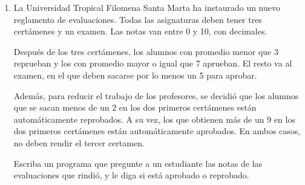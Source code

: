 \documentclass[11pt,spanish]{article}
\newcommand{\pond}[1]{[{\small\textbf{#1\%}}]}
\begin{document}
\begin{enumerate}[font=\Large\bfseries]
    \newpage
    \item
      \pond{25}
      La Universidad Tropical Filomena Santa Marta
      ha instaurado un nuevo reglamento de evaluaciones.
      Todas las asignaturas deben tener tres certámenes y un examen.
      Las notas van entre 0 y 10, con decimales.

      Después de los tres certámenes,
      los alumnos con promedio menor que 3 reprueban y
      los con promedio mayor o igual que 7 aprueban.
      El resto va al examen,
      en el que deben sacarse por lo menos un 5 para aprobar.

      Además,
      para reducir el trabajo de los profesores,
      se decidió que los alumnos que se sacan menos de un 2
      en los dos primeros certámenes
      están automáticamente reprobados.
      A su vez,
      los que obtienen más de un 9
      en los dos primeros certámenes
      están automáticamente aprobados.
      En ambos casos,
      no deben rendir el tercer certamen.

      Escriba un programa que pregunte a un estudiante
      las notas de las evaluaciones que rindió,
      y le diga si está aprobado o reprobado.

      \begin{minipage}[t]{.2\textwidth}
        
      \end{minipage}
      \hfil
      \begin{minipage}[t]{.2\textwidth}
        
      \end{minipage}
      \hfil
      \begin{minipage}[t]{.2\textwidth}
        
      \end{minipage}
      \hfil
      \begin{minipage}[t]{.2\textwidth}
        
      \end{minipage}


\end{enumerate}
\end{document}
